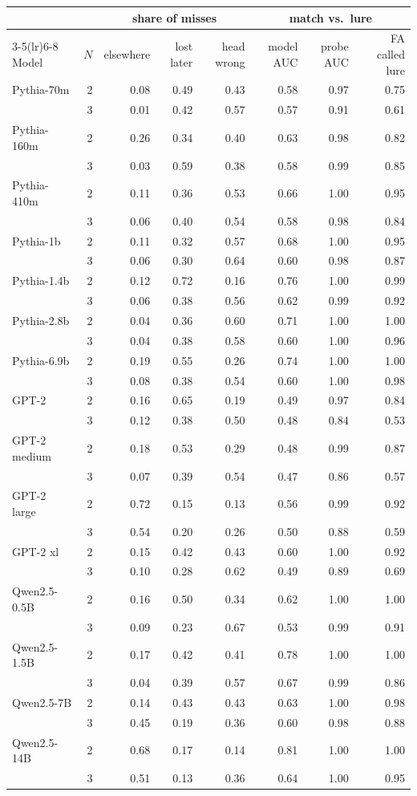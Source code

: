 \begin{tabular}{lrrrrrrr}
\toprule
& & \multicolumn{3}{c}{share of misses} & \multicolumn{3}{c}{match vs.\ lure} \\
\cmidrule(lr){3-5}\cmidrule(lr){6-8}
Model & $N$ & elsewhere & lost later & head wrong & model AUC & probe AUC & FA called lure \\
\midrule
Pythia-70m & 2 & 0.08 & 0.49 & 0.43 & 0.58 & 0.97 & 0.75 \\
 & 3 & 0.01 & 0.42 & 0.57 & 0.57 & 0.91 & 0.61 \\
Pythia-160m & 2 & 0.26 & 0.34 & 0.40 & 0.63 & 0.98 & 0.82 \\
 & 3 & 0.03 & 0.59 & 0.38 & 0.58 & 0.99 & 0.85 \\
Pythia-410m & 2 & 0.11 & 0.36 & 0.53 & 0.66 & 1.00 & 0.95 \\
 & 3 & 0.06 & 0.40 & 0.54 & 0.58 & 0.98 & 0.84 \\
Pythia-1b & 2 & 0.11 & 0.32 & 0.57 & 0.68 & 1.00 & 0.95 \\
 & 3 & 0.06 & 0.30 & 0.64 & 0.60 & 0.98 & 0.87 \\
Pythia-1.4b & 2 & 0.12 & 0.72 & 0.16 & 0.76 & 1.00 & 0.99 \\
 & 3 & 0.06 & 0.38 & 0.56 & 0.62 & 0.99 & 0.92 \\
Pythia-2.8b & 2 & 0.04 & 0.36 & 0.60 & 0.71 & 1.00 & 1.00 \\
 & 3 & 0.04 & 0.38 & 0.58 & 0.60 & 1.00 & 0.96 \\
Pythia-6.9b & 2 & 0.19 & 0.55 & 0.26 & 0.74 & 1.00 & 1.00 \\
 & 3 & 0.08 & 0.38 & 0.54 & 0.60 & 1.00 & 0.98 \\
GPT-2 & 2 & 0.16 & 0.65 & 0.19 & 0.49 & 0.97 & 0.84 \\
 & 3 & 0.12 & 0.38 & 0.50 & 0.48 & 0.84 & 0.53 \\
GPT-2 medium & 2 & 0.18 & 0.53 & 0.29 & 0.48 & 0.99 & 0.87 \\
 & 3 & 0.07 & 0.39 & 0.54 & 0.47 & 0.86 & 0.57 \\
GPT-2 large & 2 & 0.72 & 0.15 & 0.13 & 0.56 & 0.99 & 0.92 \\
 & 3 & 0.54 & 0.20 & 0.26 & 0.50 & 0.88 & 0.59 \\
GPT-2 xl & 2 & 0.15 & 0.42 & 0.43 & 0.60 & 1.00 & 0.92 \\
 & 3 & 0.10 & 0.28 & 0.62 & 0.49 & 0.89 & 0.69 \\
Qwen2.5-0.5B & 2 & 0.16 & 0.50 & 0.34 & 0.62 & 1.00 & 1.00 \\
 & 3 & 0.09 & 0.23 & 0.67 & 0.53 & 0.99 & 0.91 \\
Qwen2.5-1.5B & 2 & 0.17 & 0.42 & 0.41 & 0.78 & 1.00 & 1.00 \\
 & 3 & 0.04 & 0.39 & 0.57 & 0.67 & 0.99 & 0.86 \\
Qwen2.5-7B & 2 & 0.14 & 0.43 & 0.43 & 0.63 & 1.00 & 0.98 \\
 & 3 & 0.45 & 0.19 & 0.36 & 0.60 & 0.98 & 0.88 \\
Qwen2.5-14B & 2 & 0.68 & 0.17 & 0.14 & 0.81 & 1.00 & 1.00 \\
 & 3 & 0.51 & 0.13 & 0.36 & 0.64 & 1.00 & 0.95 \\
\bottomrule
\end{tabular}
